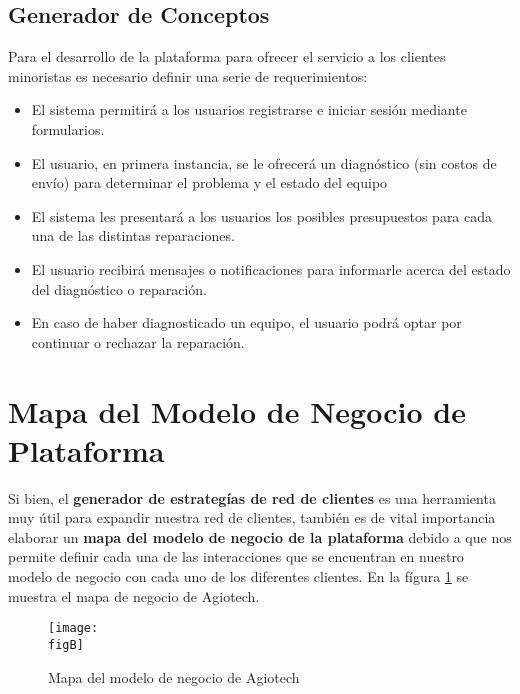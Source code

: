 \subsection{Generador de Conceptos}

Para el desarrollo de la plataforma para ofrecer el servicio a los clientes
minoristas es necesario definir una serie de requerimientos:

\begin{itemize}
	\item El sistema permitirá a los usuarios registrarse e iniciar sesión mediante
	      formularios.

	\item El usuario, en primera instancia, se le ofrecerá un diagnóstico (sin
	      costos de envío) para determinar el problema y el estado del equipo

	\item El sistema les presentará a los usuarios los posibles presupuestos para cada
	      una de las distintas reparaciones.

	\item El usuario recibirá mensajes o notificaciones para informarle acerca del
	      estado del diagnóstico o reparación.

	\item En caso de haber diagnosticado un equipo, el usuario podrá optar por
	      continuar o rechazar la reparación.
\end{itemize}


\clearpage
\section{Mapa del Modelo de Negocio de Plataforma}

Si bien, el \textbf{generador de estrategías de red de clientes} es una herramienta
muy útil para expandir nuestra red de clientes, también es de vital importancia
elaborar un \textbf{mapa del modelo de negocio de la plataforma} debido a que nos
permite definir cada una de las interacciones que se encuentran en nuestro modelo
de negocio con cada uno de los diferentes clientes. En la fígura
\ref{fig: modelo de negocio} se muestra el mapa de negocio de Agiotech.

\begin{figure}[ht]
	\centering
	\texttt{[image: \\figB]}
	\caption{Mapa del modelo de negocio de Agiotech}
	\label{fig: modelo de negocio}
\end{figure}

